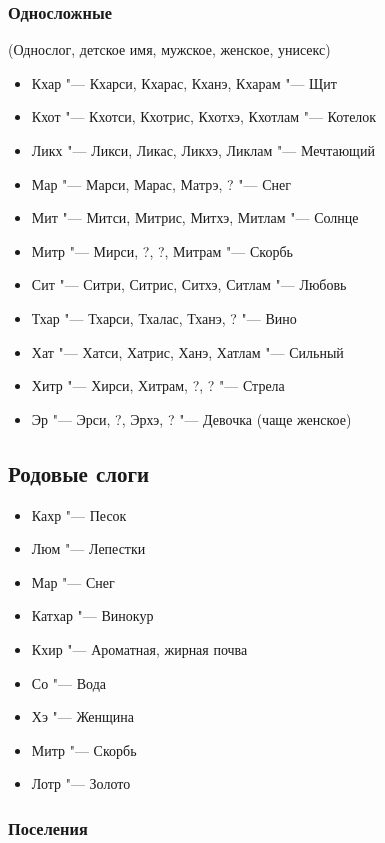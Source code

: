 \subsubsection{Односложные}

(Однослог, детское имя, мужское, женское, унисекс)

\begin{itemize}
\item Кхар "--- Кхарси, Кхарас, Кханэ, Кхарам "--- Щит
\item Кхот "--- Кхотси, Кхотрис, Кхотхэ, Кхотлам "--- Котелок
\item Ликх "--- Ликси, Ликас, Ликхэ, Ликлам "--- Мечтающий
\item Мар "--- Марси, Марас, Матрэ, ? "--- Снег
\item Мит "--- Митси, Митрис, Митхэ, Митлам "--- Солнце
\item Митр "--- Мирси, ?, ?, Митрам "--- Скорбь
\item Сит "--- Ситри, Ситрис, Ситхэ, Ситлам "--- Любовь
\item Тхар "--- Тхарси, Тхалас, Тханэ, ? "--- Вино
\item Хат "--- Хатси, Хатрис, Ханэ, Хатлам "--- Сильный
\item Хитр "--- Хирси, Хитрам, ?, ? "--- Стрела
\item Эр "--- Эрси, ?, Эрхэ, ? "--- Девочка (чаще женское)
\end{itemize}

\subsection{Родовые слоги}

\begin{itemize}
\item Кахр "--- Песок
\item Люм "--- Лепестки
\item Мар "--- Снег
\item Катхар "--- Винокур
\item Кхир "--- Ароматная, жирная почва
\item Со "--- Вода
\item Хэ "--- Женщина
\item Митр "--- Скорбь
\item Лотр "--- Золото
\end{itemize}

\subsubsection{Поселения}

